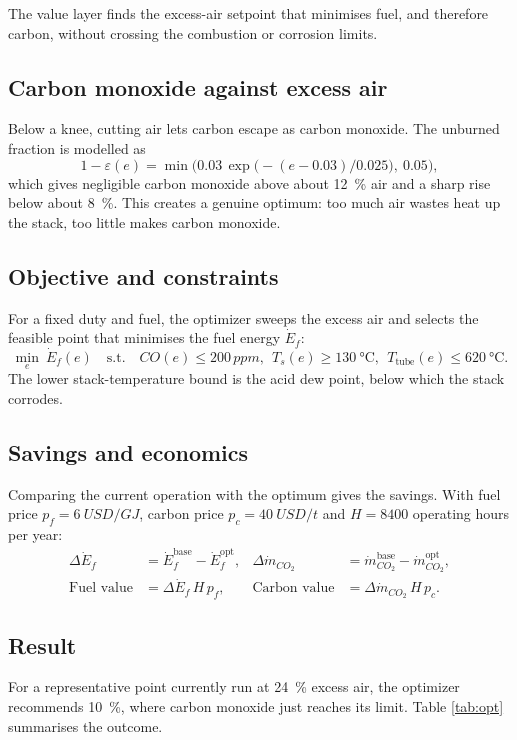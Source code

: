 \documentclass[11pt,a4paper]{article}
\begin{document}
The value layer finds the excess-air setpoint that minimises fuel, and therefore
carbon, without crossing the combustion or corrosion limits.

\subsection{Carbon monoxide against excess air}
Below a knee, cutting air lets carbon escape as carbon monoxide. The unburned
fraction is modelled as
\begin{equation}
1-\varepsilon(e) = \min\!\Big(0.03\,\exp\!\big(-(e-0.03)/0.025\big),\ 0.05\Big),
\end{equation}
which gives negligible carbon monoxide above about \SI{12}{\percent} air and a
sharp rise below about \SI{8}{\percent}. This creates a genuine optimum: too much
air wastes heat up the stack, too little makes carbon monoxide.

\subsection{Objective and constraints}
For a fixed duty and fuel, the optimizer sweeps the excess air and selects the
feasible point that minimises the fuel energy $\dot E_f$:
\begin{equation}
\min_{e}\ \dot E_f(e)
\quad\text{s.t.}\quad
CO(e)\le 200\,\si{ppm},\ \
T_s(e)\ge \SI{130}{\celsius},\ \
T_\mathrm{tube}(e)\le \SI{620}{\celsius}.
\end{equation}
The lower stack-temperature bound is the acid dew point, below which the stack
corrodes.

\subsection{Savings and economics}
Comparing the current operation with the optimum gives the savings. With fuel
price $p_f=\SI{6}{USD/GJ}$, carbon price $p_c=\SI{40}{USD/t}$ and $H=8400$
operating hours per year:
\begin{align}
\Delta \dot E_f &= \dot E_f^\mathrm{base}-\dot E_f^\mathrm{opt}, &
\Delta \dot m_{CO_2} &= \dot m_{CO_2}^\mathrm{base}-\dot m_{CO_2}^\mathrm{opt},\\
\text{Fuel value} &= \Delta \dot E_f\, H\, p_f, &
\text{Carbon value} &= \Delta \dot m_{CO_2}\, H\, p_c .
\end{align}

\subsection{Result}
For a representative point currently run at \SI{24}{\percent} excess air, the
optimizer recommends \SI{10}{\percent}, where carbon monoxide just reaches its
limit. Table \ref{tab:opt} summarises the outcome.
\end{document}
